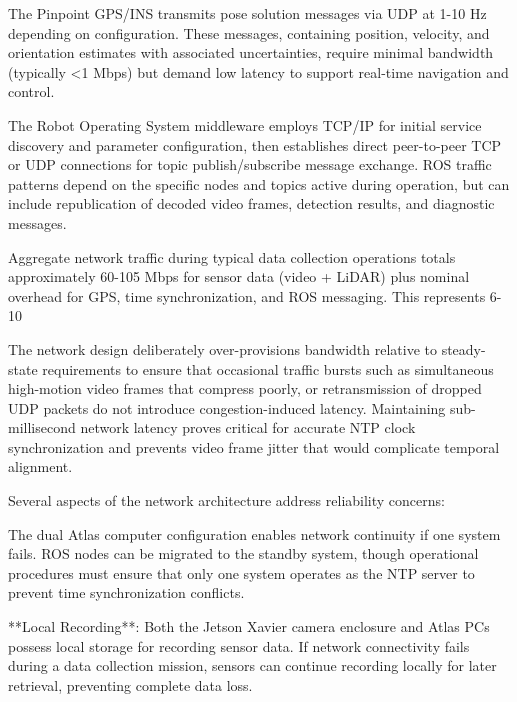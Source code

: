 \documentclass{erauthesis}
\begin{document}
The Pinpoint GPS/INS transmits pose solution messages via UDP at 1-10 Hz depending on configuration. These messages, containing position, velocity, and orientation estimates with associated uncertainties, require minimal bandwidth (typically <1 Mbps) but demand low latency to support real-time navigation and control.



The Robot Operating System middleware employs TCP/IP for initial service discovery and parameter configuration, then establishes direct peer-to-peer TCP or UDP connections for topic publish/subscribe message exchange. ROS traffic patterns depend on the specific nodes and topics active during operation, but can include republication of decoded video frames, detection results, and diagnostic messages.


Aggregate network traffic during typical data collection operations totals approximately 60-105 Mbps for sensor data (video + LiDAR) plus nominal overhead for GPS, time synchronization, and ROS messaging. This represents 6-10%

The network design deliberately over-provisions bandwidth relative to steady-state requirements to ensure that occasional traffic bursts such as simultaneous high-motion video frames that compress poorly, or retransmission of dropped UDP packets do not introduce congestion-induced latency. Maintaining sub-millisecond network latency proves critical for accurate NTP clock synchronization and prevents video frame jitter that would complicate temporal alignment.


Several aspects of the network architecture address reliability concerns:

The dual Atlas computer configuration enables network continuity if one system fails. ROS nodes can be migrated to the standby system, though operational procedures must ensure that only one system operates as the NTP server to prevent time synchronization conflicts.

**Local Recording**: Both the Jetson Xavier camera enclosure and Atlas PCs possess local storage for recording sensor data. If network connectivity fails during a data collection mission, sensors can continue recording locally for later retrieval, preventing complete data loss.
\end{document}
